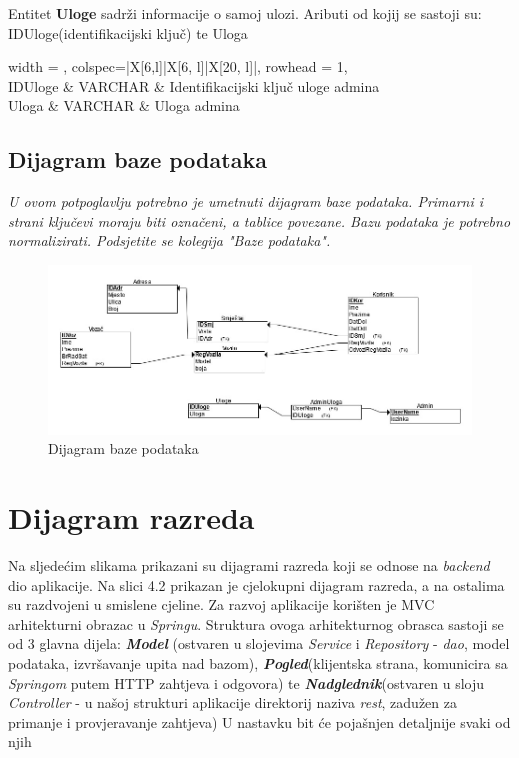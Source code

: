 				{Entitet \textbf{Uloge} sadrži informacije o samoj ulozi. Aributi od kojij se sastoji su: IDUloge(identifikacijski ključ) te Uloga}
				
				\begin{longtblr}[
					label=none,
					entry=none
					]{
						width = \textwidth,
						colspec={|X[6,l]|X[6, l]|X[20, l]|}, 
						rowhead = 1,
					} %
					\hline {}	 \\ \hline[3pt]
					IDUloge & VARCHAR	&  	Identifikacijski ključ uloge admina	\\ \hline
					Uloga	& VARCHAR & Uloga admina	\\ \hline 
					\end{longtblr}

			\subsection{Dijagram baze podataka}
				\textit{ U ovom potpoglavlju potrebno je umetnuti dijagram baze podataka. Primarni i strani ključevi moraju biti označeni, a tablice povezane. Bazu podataka je potrebno normalizirati. Podsjetite se kolegija "Baze podataka".}
			
			
			\begin{figure}[H]
				\includegraphics[width=\linewidth]{slike/DentAll_RelacijskiDijagramBaze.png}
				\centering
				\caption{Dijagram baze podataka}
				\label{fig:dijagramBaze}
			\end{figure}
			\eject
			
		\section{Dijagram razreda}
		
			{Na sljedećim slikama prikazani su dijagrami razreda koji se odnose na \textit{backend} dio aplikacije. Na slici 4.2 prikazan je cjelokupni dijagram razreda, a na ostalima su razdvojeni u smislene cjeline. Za razvoj aplikacije korišten je MVC arhitekturni obrazac u \textit{Springu}. Struktura ovoga arhitekturnog obrasca sastoji se od 3 glavna dijela: \textbf{\textit{Model}} (ostvaren u slojevima \textit{Service} i \textit{Repository} - \textit{dao}, model podataka, izvršavanje upita nad bazom), \textbf{\textit{Pogled}}(klijentska strana, komunicira sa \textit{Springom} putem HTTP zahtjeva i odgovora) te \textbf{\textit{Nadglednik}}(ostvaren u sloju \textit{Controller} - u našoj strukturi aplikacije direktorij naziva \textit{rest}, zadužen za primanje i provjeravanje zahtjeva) U nastavku bit će pojašnjen detaljnije svaki od njih}\\
			
